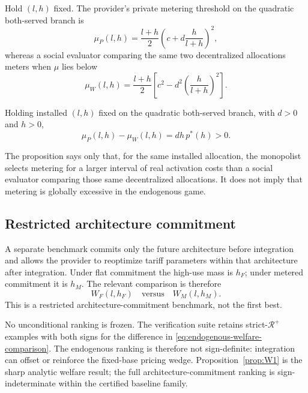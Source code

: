 Hold $(l,h)$ fixed. The provider's private metering threshold on the quadratic both-served branch is
\begin{equation}
 \mu_P(l,h)
 =\frac{l+h}{2}\left(c+d\frac{h}{l+h}\right)^2,
 \label{eq:private-threshold}
\end{equation}
whereas a social evaluator comparing the same two decentralized allocations meters when $\mu$ lies below
\begin{equation}
 \mu_W(l,h)
 =\frac{l+h}{2}
 \left[c^2-d^2\left(\frac{h}{l+h}\right)^2\right].
 \label{eq:social-threshold}
\end{equation}

\begin{proposition}\label{prop:W1}
Holding installed $(l,h)$ fixed on the quadratic both-served branch, with $d>0$ and $h>0$,
\begin{equation}
 \mu_P(l,h)-\mu_W(l,h)
 =d h\,p^*(h)>0.
 \label{eq:welfare-wedge}
\end{equation}
\end{proposition}

The proposition says only that, for the same installed allocation, the monopolist selects metering for a larger interval of real activation costs than a social evaluator comparing those same decentralized allocations. It does not imply that metering is globally excessive in the endogenous game.

\subsection{Restricted architecture commitment}

A separate benchmark commits only the future architecture before integration and allows the provider to reoptimize tariff parameters within that architecture after integration. Under flat commitment the high-use mass is $h_F$; under metered commitment it is $h_M$. The relevant comparison is therefore
\begin{equation}
 W_F(l,h_F)
 \quad\text{versus}\quad
 W_M(l,h_M).
 \label{eq:endogenous-welfare-comparison}
\end{equation}
This is a restricted architecture-commitment benchmark, not the first best.

No unconditional ranking is frozen. The verification suite retains strict-$\mathcal R^+$ examples with both signs for the difference in \eqref{eq:endogenous-welfare-comparison}. The endogenous ranking is therefore not sign-definite: integration can offset or reinforce the fixed-base pricing wedge. Proposition~\ref{prop:W1} is the sharp analytic welfare result; the full architecture-commitment ranking is sign-indeterminate within the certified baseline family.
